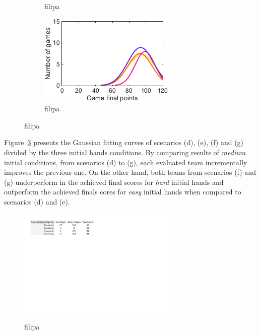\begin{figure}[h]
\begin{subfigure}[h]{0.32\textwidth}
                \caption{filipa}
                \label{fig:DEFGmedium}
        \end{subfigure}
        \begin{subfigure}[h]{0.32\textwidth}
                \includegraphics[width=\textwidth]{./img/4/DEFGeasy}
                \caption{filipa}
                \label{fig:DEFGeasy}
        \end{subfigure}
        \caption{filipa}
        \label{fig:DEFG-CH}
\end{figure}

Figure~\ref{fig:DEFG-CH} presents the Gaussian fitting curves of scenarios (d), (e), (f) and (g) divided by the three initial hands conditions.
By comparing results of \emph{medium} initial conditions, from scenarios (d) to (g), each evaluated team incrementally improves the previous one.
On the other hand, both teams from scenarios (f) and (g) underperform in the achieved final scores for \emph{hard} initial hands and outperform the achieved finals cores for \emph{easy} initial hands when compared to scenarios (d) and (e).

\begin{figure}[h!]
  \centering
    \includegraphics[width=0.7\textwidth]{./img/4/DEFG-fgr}
  \caption{filipa}
\label{fig:DEFG-fgr}
\end{figure}

